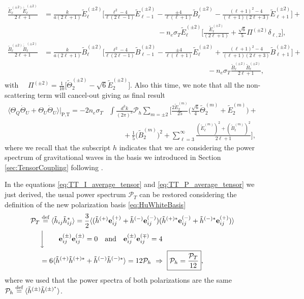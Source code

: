 \begin{align*}
    \frac{\tilde E_\ell^{(\pm2)}\dot{\tilde E}_\ell^{(\pm2)}}{2\ell+1}&=\frac{k}{a(2\ell+1)}\tilde E_\ell^{(\pm2)}\bigg[\frac{\ell^2-4}{\ell(2\ell-1)}\tilde E_{\ell-1}^{(\pm2)}-\frac{\pm4}{\ell(\ell+1)}\tilde B_\ell^{(\pm2)}-\frac{(\ell+1)^2-4}{(\ell+1)(2\ell+3)}\tilde E_{\ell+1}^{(\pm2)}\bigg]+\nonumber\\&\qquad\qquad\quad\qquad\qquad\qquad\qquad\qquad\quad-n_e\sigma_T\tilde E_\ell^{(\pm2)}\bigg[\frac{\tilde E_{\ell}^{(\pm2)}}{(2\ell+1)}+\frac{\sqrt{6}}{5}\Pi^{(\pm2)}\delta_{\ell,2}\bigg],\\
    \frac{\tilde B_\ell^{(\pm2)}\dot{\tilde B}_\ell^{(\pm2)}}{2\ell+1}&=\frac{k}{a(2\ell+1)}\tilde B_\ell^{(\pm2)}\bigg[\frac{\ell^2-4}{\ell(2\ell-1)}\tilde B_{\ell-1}^{(\pm2)}-\frac{\pm4}{\ell(\ell+1)}\tilde E_\ell^{(\pm2)}+\frac{(\ell+1)^2-4}{(\ell+1)(2\ell+3)}\tilde B_{\ell+1}^{(\pm2)}\bigg]+\nonumber\\&\qquad\qquad\qquad\qquad\qquad\qquad\qquad\qquad\qquad\qquad\qquad\quad-n_e\sigma_T\frac{\tilde B_\ell^{(\pm2)}\tilde B_{\ell}^{(\pm2)}}{2\ell+1},
\end{align*}
with $\quad\Pi^{(\pm2)}=\frac{1}{10}\big[\tilde\Theta_2^{(\pm2)}-\sqrt{6}\tilde E_2^{(\pm2)}\big]$. Also this time, we note that all the non-scattering term will cancel-out giving as final result
\begin{align}
    \langle\Theta_Q\dot\Theta_U+\Theta_U\dot\Theta_U\rangle\bigg|_\text{P,T}=-2n_e\sigma_T&\int\frac{d^3k}{(2\pi)^3}\mathcal{P}_h\sum_{m=\pm2}\bigg[\frac{2\tilde E_2^{(m)}}{25}\bigg(\frac{\sqrt{6}}{4}\tilde\Theta_2^{(m)}+\tilde E_2^{(m)}\bigg)+\nonumber\\&\qquad+\frac{1}{5}\bigg(\tilde B_2^{(m)}\bigg)^2+\sum_{\ell=3}^{\infty}\frac{(\tilde E_\ell^{(m)})^2+(\tilde B_\ell^{(m)})^2}{2\ell+1}\bigg],\label{eq:TT_P_average_tensor}
\end{align}
where we recall that the subscript $h$ indicates that we are considering the power spectrum of gravitational waves in the basis we introduced in Section \ref{sec:TensorCoupling} following \cite{HuWhite}.  

In the equations \eqref{eq:TT_I_average_tensor} and \eqref{eq:TT_P_average_tensor} we just derived, the usual power spectrum $\mathcal{P}_T$ can be restored considering the definition of the new polarization basis \eqref{eq:HuWhiteBasis}
\begin{align*}
    \mathcal{P}_T&\defeq\langle \tilde h_{ij}\tilde h^*_{ij}\rangle=\frac{3}{2}\langle (\tilde h^{(+)}\mathbf e_{ij}^{(+)}+\tilde h^{(-)}\mathbf e_{ij}^{(-)})(\tilde h^{(+)*}\mathbf e_{ij}^{(-)}+\tilde h^{(-)*}\mathbf e_{ij}^{(+)})\rangle\\
    &\bigg \downarrow\qquad \mathbf{e}_{ij}^{(\pm)}\mathbf{e}_{ij}^{(\pm)}=0\quad \text{and}\quad \mathbf{e}_{ij}^{(\pm)}\mathbf{e}_{ij}^{(\mp)}=4 
    \\
    &=6\langle\tilde h^{(+)}\tilde h^{(+)*}+\tilde h^{(-)}\tilde h^{(-)*}\rangle=12\mathcal{P}_h\ \Rightarrow\ \boxed{\mathcal{P}_h=\frac{\mathcal{P}_T}{12}},
\end{align*}
where we used that the power spectra of both polarizations are the same $\mathcal{P}_h\stackrel{\text{def}}{=}\langle\tilde h^{(\pm)}\tilde h^{(\pm)^*}\rangle$. 
